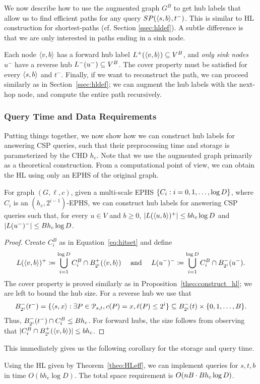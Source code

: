 We now describe how to use the augmented graph $G^B$ to get hub labels that allow us to find efficient paths for any query $SP(\pp{s,b},t^-)$.
This is similar to HL construction for shortest-paths (cf. Section \ref{ssec:hldef}).
A subtle difference is that we are only interested in paths ending in a sink node.

Each node $\pp{v,b}$ has a forward hub label $\Lf(\pp{v,b})\subseteq V^B$, and \emph{only sink nodes} $u^-$ have a reverse hub $\Lb(u^-)\subseteq V^B$.
The cover property must be satisfied for every $\pp{s,b}$ and $t^-$.
Finally, if we want to reconstruct the path, we can proceed similarly as in Section~\ref{ssec:hldef}; we can augment the hub labels with the next-hop node, and compute the entire path recursively.

\subsubsection{Query Time and Data Requirements}
Putting things together, we now show how we can construct hub labels for answering CSP queries, such that their preprocessing time and storage is parameterized by the CHD $h_c$.
Note that we use the augmented graph primarily as a theoretical construction.
From a computational point of view, we can obtain the HL using only an EPHS of the original graph.

\begin{theorem}
\label{theo:HLeff}
For graph $(G,\ell,c)$, given a multi-scale EPHS $\crl*{C_i:i=0,1,\ldots,\log D}$, where $C_i$ is an $(h_c,2^{i-1})$-EPHS, we can construct hub labels for answering CSP queries such that, for every $u\in V$ and $b\geq 0$, $\card{L(\pp{u,b})^+}\leq bh_c\log D$ and $\card{L(u^-)^-}\leq Bh_c\log D$. 
\end{theorem}
\begin{proof}
Create $C_i^B$ as in Equation~\eqref{eq:hitset} and define
\[
L(\pp{v,b})^+ \defeq \bigcup_{i=1}^{\log D} C_i^B\cap \Bf_{2^i}(\pp{v,b}) \quad\text{ and }\quad
L(u^-)^-  \defeq \bigcup_{i=1}^{\log D} C_i^B\cap \Bb_{2^i}(u^-).
\]
The cover property is proved similarly as in Proposition~\ref{theo:construct_hl}; we are left to bound the hub size.
For a reverse hub we use that
\[
\Bb_{2^i}(t^-) = \{\pp{s,x}: \exists P\in \Pst, c(P)=x, \ell(P)\leq 2^i\}
\subseteq \Bb_{2^i}(t)\times \{0,1,\ldots,B\}.
\]
Thus, $\Bb_{2^i}(t^-)\cap C_i^B\leq Bh_c$.
For forward hubs, the size follows from observing that $ \card{C_i^B\cap \Bf_{2^i}(\pp{v,b})}\leq bh_c$.
\end{proof}

This immediately gives us the following corollary for the storage and query time.
\begin{corollary}
Using the HL given by Theorem~\ref{theo:HLeff}, we can implement queries for $s,t,b$ in time $O(b h_c\log D)$.
The total space requirement is $\Or(nB \cdot Bh_c\log D)$.
\end{corollary}